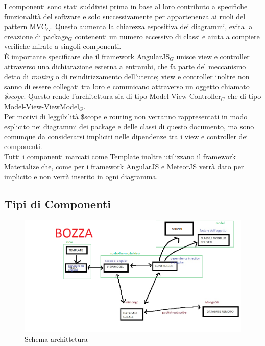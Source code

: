 I componenti sono stati suddivisi prima in base al loro contributo a specifiche funzionalità del software e solo successivamente per appartenenza ai ruoli del pattern MVC$_G$. Questo aumenta la chiarezza espositiva dei diagrammi, evita la creazione di package$_G$ contenenti un numero eccessivo di classi e aiuta a compiere verifiche mirate a singoli componenti. \\
È importante specificare che il framework AngularJS$_G$ unisce view e controller attraverso una dichiarazione esterna a entrambi, che fa parte del meccanismo detto di \textit{routing} o di reindirizzamento dell'utente; view e controller inoltre non sanno di essere collegati tra loro e comunicano attraverso un oggetto chiamato \textit{\$scope}. Questo rende l'architettura sia di tipo Model-View-Controller$_G$ che di tipo Model-View-ViewModel$_G$. \\
Per motivi di leggibilità \$scope e routing non verranno rappresentati in modo esplicito nei diagrammi dei package e delle classi di questo documento, ma sono comunque da considerarsi impliciti nelle dipendenze tra i view e controller dei componenti. \\
Tutti i componenti marcati come Template inoltre utilizzano il framework Materialize che, come per i framework AngularJS e MeteorJS verrà dato per implicito e non verrà inserito in ogni diagramma.

\subsection{Tipi di Componenti}

\begin{figure}[H]
\begin{center}
\includegraphics[scale=0.50]{img/architettura.png}
\caption{Schema archittetura}
\end{center}
\end{figure}


